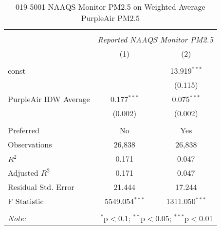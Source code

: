 \begin{table}[!htbp] \centering
  \caption{019-5001 NAAQS Monitor PM2.5 on Weighted Average PurpleAir PM2.5}
  \label{tab:reg_019-5001}
\begin{tabular}{@{\extracolsep{5pt}}lcc}
\\[-1.8ex]\hline
\hline \\[-1.8ex]
& \multicolumn{2}{c}{\textit{Reported NAAQS Monitor PM2.5}} \
\cr \cline{2-3}
\\[-1.8ex] & (1) & (2) \\
\hline \\[-1.8ex]
 const & & 13.919$^{***}$ \\
  & & (0.115) \\
 PurpleAir IDW Average & 0.177$^{***}$ & 0.075$^{***}$ \\
  & (0.002) & (0.002) \\
\hline \\[-1.8ex]
 Preferred & No & Yes \\
 Observations & 26,838 & 26,838 \\
 $R^2$ & 0.171 & 0.047 \\
 Adjusted $R^2$ & 0.171 & 0.047 \\
 Residual Std. Error & 21.444 & 17.244  \\
 F Statistic & 5549.054$^{***}$  & 1311.050$^{***}$  \\
\hline
\hline \\[-1.8ex]
\textit{Note:} & \multicolumn{2}{r}{$^{*}$p$<$0.1; $^{**}$p$<$0.05; $^{***}$p$<$0.01} \\
\end{tabular}
\end{table}